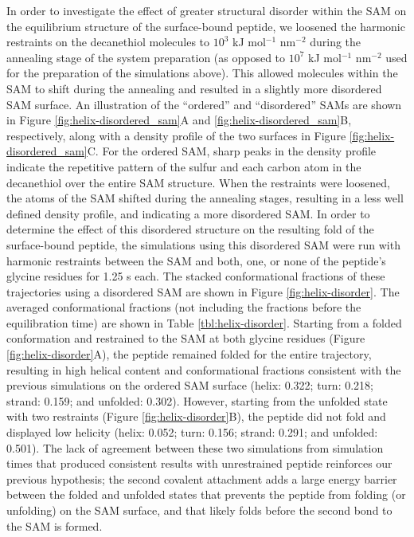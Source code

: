 In order to investigate the effect of greater structural disorder within the SAM on the equilibrium structure of the surface-bound peptide, we loosened the harmonic restraints on the decanethiol molecules to $10^3$ kJ mol$^{-1}$ nm$^{-2}$ during the annealing stage of the system preparation (as opposed to $10^7$ kJ mol$^{-1}$ nm$^{-2}$ used for the preparation of the simulations above). 
This allowed molecules within the SAM to shift during the annealing and resulted in a slightly more disordered SAM surface. 
An illustration of the ``ordered'' and ``disordered'' SAMs are shown in Figure \ref{fig:helix-disordered_sam}A and \ref{fig:helix-disordered_sam}B, respectively, along with a density profile of the two surfaces in Figure \ref{fig:helix-disordered_sam}C. 
For the ordered SAM, sharp peaks in the density profile indicate the repetitive pattern of the sulfur and each carbon atom in the decanethiol over the entire SAM structure. 
When the restraints were loosened, the atoms of the SAM shifted during the annealing stages, resulting in a less well defined density profile, and indicating a more disordered SAM. 
In order to determine the effect of this disordered structure on the resulting fold of the surface-bound peptide, the simulations using this disordered SAM were run with harmonic restraints between the SAM and both, one, or none of the peptide's glycine residues for 1.25 \textmu{}s each. 
The stacked conformational fractions of these trajectories using a disordered SAM are shown in Figure \ref{fig:helix-disorder}. 
The averaged conformational fractions (not including the fractions before the equilibration time) are shown in Table \ref{tbl:helix-disorder}. 
Starting from a folded conformation and restrained to the SAM at both glycine residues (Figure \ref{fig:helix-disorder}A), the peptide remained folded for the entire trajectory, resulting in high helical content and conformational fractions consistent with the previous simulations on the ordered SAM surface (helix: 0.322; turn: 0.218; strand: 0.159; and unfolded: 0.302). 
However, starting from the unfolded state with two restraints (Figure \ref{fig:helix-disorder}B), the peptide did not fold and displayed low helicity (helix: 0.052; turn: 0.156; strand: 0.291; and unfolded: 0.501). 
The lack of agreement between these two simulations from simulation times that produced consistent results with unrestrained peptide reinforces our previous hypothesis; the second covalent attachment adds a large energy barrier between the folded and unfolded states that prevents the peptide from folding (or unfolding) on the SAM surface, and that \pep{} likely folds before the second bond to the SAM is formed.


